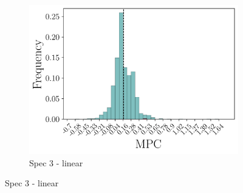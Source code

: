 \begin{figure}[t]
\begin{subfigure}{0.33\linewidth}
        \includegraphics[width=\linewidth]{figures/distributions/spec3_lin_chSNDexp.png}
        \caption{Spec 3 - linear}
    \end{subfigure}\hfill
    

\end{figure}
